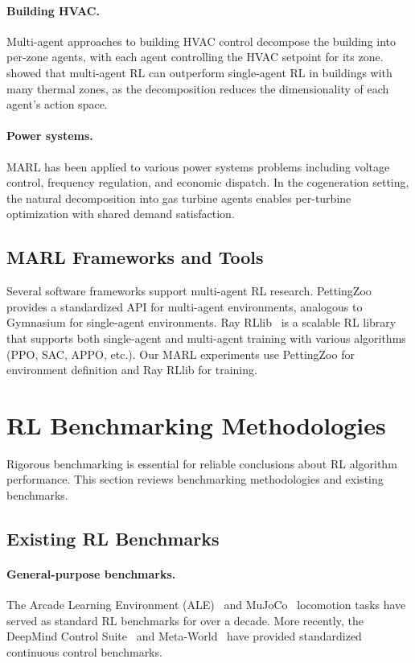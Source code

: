 \paragraph{Building HVAC.} Multi-agent approaches to building HVAC control decompose the building into per-zone agents, with each agent controlling the HVAC setpoint for its zone.~\citet{yu2021marl_building} showed that multi-agent RL can outperform single-agent RL in buildings with many thermal zones, as the decomposition reduces the dimensionality of each agent's action space.

\paragraph{Power systems.} MARL has been applied to various power systems problems including voltage control, frequency regulation, and economic dispatch. In the cogeneration setting, the natural decomposition into gas turbine agents enables per-turbine optimization with shared demand satisfaction.

\subsection{MARL Frameworks and Tools}

Several software frameworks support multi-agent RL research. PettingZoo~\citep{terry2021pettingzoo} provides a standardized API for multi-agent environments, analogous to Gymnasium for single-agent environments. Ray RLlib~\citep{liang2018rllib} is a scalable RL library that supports both single-agent and multi-agent training with various algorithms (PPO, SAC, APPO, etc.). Our MARL experiments use PettingZoo for environment definition and Ray RLlib for training.

\section{RL Benchmarking Methodologies}
\label{sec:lit_bench}

Rigorous benchmarking is essential for reliable conclusions about RL algorithm performance. This section reviews benchmarking methodologies and existing benchmarks.

\subsection{Existing RL Benchmarks}

\paragraph{General-purpose benchmarks.} The Arcade Learning Environment (ALE)~\citep{bellemare2013ale} and MuJoCo~\citep{todorov2012mujoco} locomotion tasks have served as standard RL benchmarks for over a decade. More recently, the DeepMind Control Suite~\citep{tassa2018dmcontrol} and Meta-World~\citep{yu2020metaworld} have provided standardized continuous control benchmarks.


